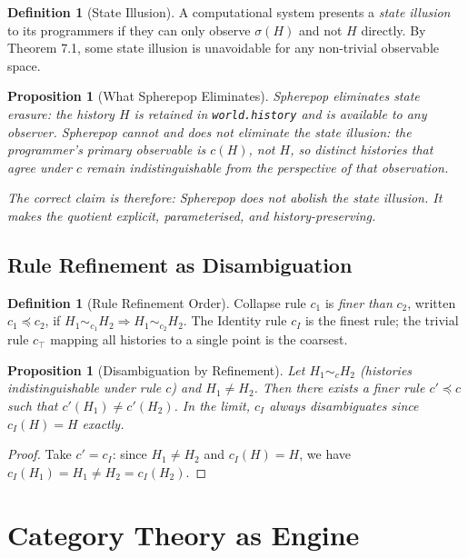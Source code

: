 \documentclass[12pt, a4paper, openany]{book}
\theoremstyle{plain}
\newtheorem{proposition}[theorem]{Proposition}
\theoremstyle{definition}
\newtheorem{definition}[theorem]{Definition}
\theoremstyle{remark}
\begin{document}
\begin{definition}[State Illusion]
A computational system presents a \emph{state illusion} to its programmers if
they can only observe $\sigma(H)$ and not $H$ directly. By Theorem 7.1, some
state illusion is unavoidable for any non-trivial observable space.
\end{definition}

\begin{proposition}[What Spherepop Eliminates]
Spherepop eliminates state erasure: the history $H$ is retained in
\texttt{world.history} and is available to any observer. Spherepop cannot and
does not eliminate the state illusion: the programmer's primary observable is
$c(H)$, not $H$, so distinct histories that agree under $c$ remain
indistinguishable from the perspective of that observation.

The correct claim is therefore: Spherepop does not abolish the state illusion.
It makes the quotient explicit, parameterised, and history-preserving.
\end{proposition}

\section{Rule Refinement as Disambiguation}

\begin{definition}[Rule Refinement Order]
Collapse rule $c_1$ is \emph{finer than} $c_2$, written $c_1 \preceq c_2$, if
$H_1 \sim_{c_1} H_2 \Rightarrow H_1 \sim_{c_2} H_2$. The Identity rule $c_I$ is
the finest rule; the trivial rule $c_\top$ mapping all histories to a single point
is the coarsest.
\end{definition}

\begin{proposition}[Disambiguation by Refinement]
Let $H_1 \sim_c H_2$ (histories indistinguishable under rule $c$) and $H_1 \neq H_2$.
Then there exists a finer rule $c' \preceq c$ such that $c'(H_1) \neq c'(H_2)$.
In the limit, $c_I$ always disambiguates since $c_I(H) = H$ exactly.
\end{proposition}

\begin{proof}
Take $c' = c_I$: since $H_1 \neq H_2$ and $c_I(H) = H$, we have
$c_I(H_1) = H_1 \neq H_2 = c_I(H_2)$.
\end{proof}

\chapter{Category Theory as Engine}
\end{document}
